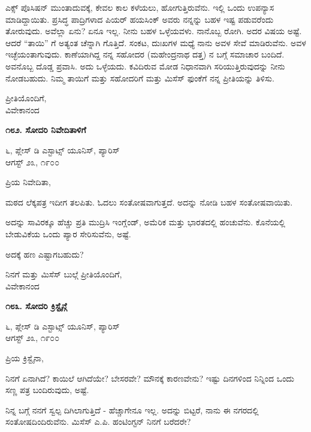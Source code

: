 ಎಕ್ಸ್ ಪೊಸಿಷನ್ ಮುಂತಾದುವಕ್ಕೆ, ಕೇವಲ ಕಾಲ ಕಳೆಯಲು, ಹೋಗುತ್ತಿರುವೆನು. ಇಲ್ಲಿ ಒಂದು ಉಪನ್ಯಾಸ ಮಾಡಿದ್ದಾಯಿತು. ಪ್ರಸಿದ್ಧ ಪಾದ್ರಿಗಳಾದ ಪಿಯರ್ ಹಯಸಿಂಕ್ ಅವರು ನನ್ನನ್ನು ಬಹಳ ಇಷ್ಟ ಪಡುವರೆಂದು ತೋರುವುದು. ಅವೆಲ್ಲಾ ಏನು? ಏನೂ ಇಲ್ಲ. ನೀನು ಬಹಳ ಒಳ್ಳೆಯವಳು. ನಾನೊಬ್ಬ ರೋಗಿ. ಅದರ ವಿಷಯ ಅಷ್ಟೆ. ಆದರೆ “ತಾಯಿ” ಗೆ ಅತ್ಯಂತ ಚೆನ್ನಾಗಿ ಗೊತ್ತಿದೆ. ಸಂಕಟ, ದುಃಖಗಳ ಮಧ್ಯೆ ನಾನು ಅವಳ ಸೇವೆ ಮಾಡಿರುವೆನು. ಅವಳ ಇಚ್ಛೆಯಂತಾಗುವುದು. ಕಾಣೆಯಾಗಿದ್ದ ನನ್ನ ಸಹೋದರ (ಮಹೇಂದ್ರನಾಥ ದತ್ತ) ನ ಬಗ್ಗೆ ಸಮಾಚಾರ ಬಂದಿದೆ. ಅವನೊಬ್ಬ ದೊಡ್ಡ ಪ್ರವಾಸಿ. ಅದು ಒಳ್ಳೆಯದು. ಕವಿದಿರುವ ಮೋಡ ನಿಧಾನವಾಗಿ ಸರಿಯುತ್ತಿರುವುದನ್ನು ನೀನು ನೋಡಬಹುದು. ನಿಮ್ಮ ತಾಯಿಗೆ ಮತ್ತು ಸಹೋದರಿಗೆ ಮತ್ತು ಮಿಸೆಸ್ ಫುಂಕೆಗೆ ನನ್ನ ಪ್ರೀತಿಯನ್ನು ತಿಳಿಸು.

\begin{flushright}
ಪ್ರೀತಿಯೊಂದಿಗೆ,\\ವಿವೇಕಾನಂದ
\end{flushright}

\begin{center}
\textbf{೧೮೨. ಸೋದರಿ ನಿವೇದಿತಾಳಿಗೆ}
\end{center}

\begin{flushright}
೬, ಪ್ಲೇಸ್ ಡಿ ಎಸ್ಟಾಟ್ಸ್ ಯೂನಿಸ್, ಪ್ಯಾರಿಸ್\\ಆಗಸ್ಟ್ ೨೩, ೧೯೦೦
\end{flushright}

ಪ್ರಿಯ ನಿವೇದಿತಾ,

ಮಠದ ಲೆಕ್ಕಪತ್ರ ಇದೀಗ ತಲಪಿತು. ಓದಲು ಸಂತೋಷವಾಗುತ್ತದೆ. ಅದನ್ನು ನೋಡಿ ಬಹಳ ಸಂತೋಷವಾಯಿತು.

ಅದನ್ನು ಸಾವಿರಕ್ಕೂ ಹೆಚ್ಚು ಪ್ರತಿ ಮುದ್ರಿಸಿ ಇಂಗ್ಲೆಂಡ್, ಅಮೆರಿಕ ಮತ್ತು ಭಾರತದಲ್ಲಿ ಹಂಚುವೆನು. ಕೊನೆಯಲ್ಲಿ ಬೇಡುವಿಕೆಯ ಒಂದು ಪ್ಯಾರ ಸೇರಿಸುವೆನು, ಅಷ್ಟೆ.

ಅದಕ್ಕೆ ಹಣ ಎಷ್ಟಾಗಬಹುದು?

\begin{flushright}
ನಿನಗೆ ಮತ್ತು ಮಿಸೆಸ್ ಬುಲ್ಗೆ ಪ್ರೀತಿಯೊಂದಿಗೆ,\\ವಿವೇಕಾನಂದ
\end{flushright}

\begin{center}
\textbf{೧೮೩. ಸೋದರಿ ಕ್ರಿಸ್ಟೈನ್ಗೆ}
\end{center}

\begin{flushright}
೬, ಪ್ಲೇಸ್ ಡಿ ಎಸ್ಟಾಟ್ಸ್ ಯೂನಿಸ್, ಪ್ಯಾರಿಸ್\\ಆಗಸ್ಟ್ ೨೩, ೧೯೦೦
\end{flushright}

ಪ್ರಿಯ ಕ್ರಿಸ್ಟೈನಾ,

ನಿನಗೆ ಏನಾಗಿದೆ? ಕಾಯಿಲೆ ಆಗಿದೆಯೇ? ಬೇಸರವೇ? ಮೌನಕ್ಕೆ ಕಾರಣವೇನು? ಇಷ್ಟು ದಿನಗಳಿಂದ ನಿನ್ನಿಂದ ಒಂದು ಸಣ್ಣ ಪತ್ರ ಬಂದಿರುವುದು, ಅಷ್ಟೆ.

ನಿನ್ನ ಬಗ್ಗೆ ನನಗೆ ಸ್ವಲ್ಪ ದಿಗಿಲಾಗುತ್ತಿದೆ - ಹೆಚ್ಚಾಗೇನೂ ಇಲ್ಲ. ಅದನ್ನು ಬಿಟ್ಟರೆ, ನಾನು ಈ ನಗರದಲ್ಲಿ ಸಂತೋಷದಿಂದಿರುವೆನು. ಮಿಸೆಸ್ ಎ.ಪಿ. ಹಂಟಿಂಗ್ಟನ್ ನಿನಗೆ ಬರೆದರೇ?

